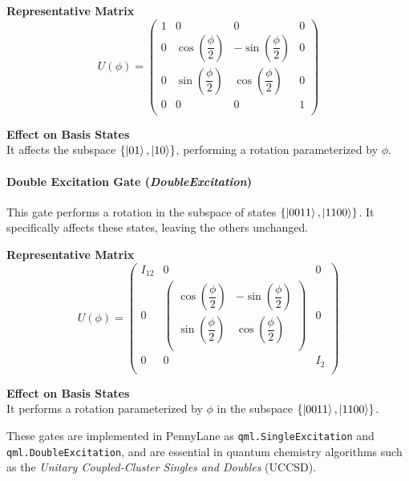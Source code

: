\vspace{0.5em}
\begin{minipage}{\textwidth}
    \begin{minipage}[t]{0.45\textwidth}
        \centering
        \textbf{Representative Matrix}\\[0.5em]
        \[
        U(\phi) = \begin{pmatrix}
        1 & 0 & 0 & 0 \\
        0 & \cos\left( \dfrac{\phi}{2} \right) & -\sin\left( \dfrac{\phi}{2} \right) & 0 \\
        0 & \sin\left( \dfrac{\phi}{2} \right) & \cos\left( \dfrac{\phi}{2} \right) & 0 \\
        0 & 0 & 0 & 1 \\
        \end{pmatrix}
        \]
    \end{minipage}
    \hfill
    \begin{minipage}[t]{0.45\textwidth}
        \centering
        \textbf{Effect on Basis States}\\[0.5em]
        It affects the subspace $\{\ket{01}, \ket{10}\}$, performing a rotation parameterized by $\phi$.
    \end{minipage}
\end{minipage}

\paragraph{Double Excitation Gate (\textit{DoubleExcitation})}

This gate performs a rotation in the subspace of states $\{\ket{0011}, \ket{1100}\}$. It specifically affects these states, leaving the others unchanged.

\vspace{0.5em}
\begin{minipage}{\textwidth}
    \begin{minipage}[t]{0.45\textwidth}
        \centering
        \textbf{Representative Matrix}\\[0.5em]
        \[
        U(\phi) = \begin{pmatrix}
        I_{12} & 0 & 0 \\
        0 & \begin{pmatrix}
        \cos\left( \dfrac{\phi}{2} \right) & -\sin\left( \dfrac{\phi}{2} \right) \\
        \sin\left( \dfrac{\phi}{2} \right) & \cos\left( \dfrac{\phi}{2} \right) \\
        \end{pmatrix} & 0 \\
        0 & 0 & I_2 \\
        \end{pmatrix}
        \]
    \end{minipage}
    \hfill
    \begin{minipage}[t]{0.45\textwidth}
        \centering
        \textbf{Effect on Basis States}\\[0.5em]
        It performs a rotation parameterized by $\phi$ in the subspace $\{\ket{0011}, \ket{1100}\}$.
    \end{minipage}
\end{minipage}

These gates are implemented in PennyLane as \texttt{qml.SingleExcitation} and \linebreak\texttt{qml.DoubleExcitation}, and are essential in quantum chemistry algorithms such as the \textit{Unitary Coupled-Cluster Singles and Doubles} (UCCSD).
